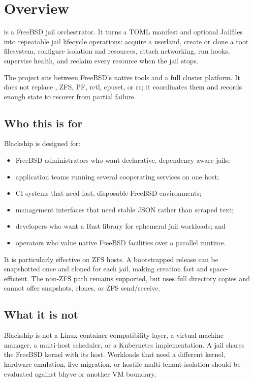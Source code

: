 \chapter{Overview}
\label{ch:overview}

\Blackship{} is a FreeBSD jail orchestrator. It turns a TOML manifest and
optional Jailfiles into repeatable jail lifecycle operations: acquire a
userland, create or clone a root filesystem, configure isolation and resources,
attach networking, run hooks, supervise health, and reclaim every resource when
the jail stops.

The project sits between FreeBSD's native tools and a full cluster platform. It
does not replace , ZFS, PF, rctl, cpuset, or rc; it coordinates
them and records enough state to recover from partial failure.

\section{Who this is for}

Blackship is designed for:

\begin{itemize}
  \item FreeBSD administrators who want declarative, dependency-aware jails;
  \item application teams running several cooperating services on one host;
  \item CI systems that need fast, disposable FreeBSD environments;
  \item management interfaces that need stable JSON rather than scraped text;
  \item developers who want a Rust library for ephemeral jail workloads; and
  \item operators who value native FreeBSD facilities over a parallel runtime.
\end{itemize}

It is particularly effective on ZFS hosts. A bootstrapped release can be
snapshotted once and cloned for each jail, making creation fast and
space-efficient. The non-ZFS path remains supported, but uses full directory
copies and cannot offer snapshots, clones, or ZFS send/receive.

\section{What it is not}

Blackship is not a Linux container compatibility layer, a virtual-machine
manager, a multi-host scheduler, or a Kubernetes implementation. A jail shares
the FreeBSD kernel with its host. Workloads that need a different kernel,
hardware emulation, live migration, or hostile multi-tenant isolation should be
evaluated against bhyve or another VM boundary.

